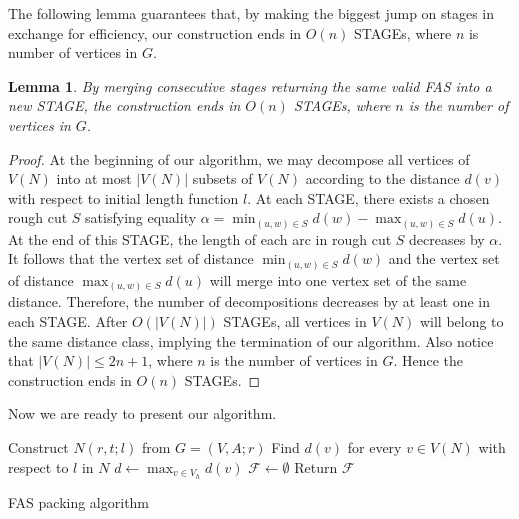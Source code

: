 \documentclass[11pt]{article}
\newtheorem{lemma}[theorem]{Lemma}
\begin{document}
The following lemma guarantees that, by making the biggest jump on stages in exchange for efficiency, our construction ends in $O(n)$ STAGEs, where $n$ is number of vertices in $G$.

\begin{lemma}
\label{lem:5}
By merging consecutive stages returning the same valid FAS into a new STAGE, the construction ends in $O(n)$ STAGEs, where $n$ is the number of vertices in $G$.
\end{lemma}
\begin{proof}
At the beginning of our algorithm, we may decompose all vertices of $V(N)$ into at most $\lvert V(N)\rvert$ subsets of $V(N)$ according to the distance $d(v)$ with respect to initial length function $l$. At each STAGE, there exists a chosen rough cut $S$ satisfying equality $\alpha=\min_{(u,w)\in S} d(w)-\max_{(u,w)\in S} d(u)$. At the end of this STAGE, the length of each arc in rough cut $S$ decreases by $\alpha$. It follows that the vertex set of distance $\min_{(u,w)\in S} d(w)$ and the vertex set of distance $\max_{(u,w)\in S} d(u)$ will merge into one vertex set of the same distance. Therefore, the number of decompositions decreases by at least one in each STAGE. After $O(\lvert V(N)\rvert)$ STAGEs, all vertices in $V(N)$ will belong to the same distance class, implying the termination of our algorithm. Also notice that $\lvert V(N)\rvert\leq 2n+1$, where $n$ is the number of vertices in $G$. Hence the construction ends in $O(n)$ STAGEs.
\end{proof}
Now we are ready to present our algorithm. 
\SetAlFnt{\small}
\begin{algorithm}[!ht]
  \SetAlgoLined
  \SetAlgoNoEnd
  \BlankLine
  Construct $N(r,t;l)$ from $G=(V,A;r)$\;
  Find $d(v)$ for every $v\in V(N)$ with respect to $l$ in $N$\; %
  $d\leftarrow \max_{v\in V_h}d(v)$\;
  $\mathcal{F}\leftarrow \emptyset$\;
  Return $\mathcal{F}$\;
  \BlankLine
  \caption{FAS packing algorithm}
\end{algorithm} 
\end{document}

